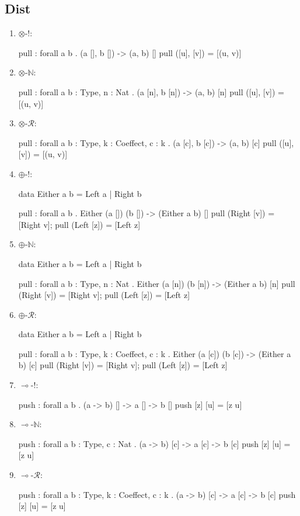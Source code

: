 \subsection{Dist}
\begin{enumerate}
\item $\otimes$-!:
\begin{granule}
pull : forall a b . (a [], b []) -> (a, b) []
pull ([u], [v]) = [(u, v)]
\end{granule}
\item $\otimes$-$\mathbb{N}$:
\begin{granule}
pull : forall {a b : Type, n : Nat} 
     . (a [n], b [n]) 
     -> (a, b) [n]
pull ([u], [v]) = [(u, v)]
\end{granule}
\item $\otimes$-$\mathcal{R}$:
\begin{granule}
pull : forall {a b : Type, k : Coeffect, c : k} 
     . (a [c], b [c]) 
     -> (a, b) [c]
pull ([u], [v]) = [(u, v)]
\end{granule}
\item $\oplus$-!:
\begin{granule}
data Either a b = Left a | Right b

pull : forall a b 
     . Either (a []) (b []) 
     -> (Either a b) []
pull (Right [v]) = [Right v];
pull (Left [z]) = [Left z]
\end{granule}
\item $\oplus$-$\mathbb{N}$:
\begin{granule}
data Either a b = Left a | Right b

pull : forall {a b : Type, n : Nat} 
     . Either (a [n]) (b [n]) 
     -> (Either a b) [n]
pull (Right [v]) = [Right v];
pull (Left [z]) = [Left z]
\end{granule}
\item $\oplus$-$\mathcal{R}$:
\begin{granule}
data Either a b = Left a | Right b

pull : forall {a b : Type, k : Coeffect, c : k} 
     . Either (a [c]) (b [c]) 
     -> (Either a b) [c]
pull (Right [v]) = [Right v];
pull (Left [z]) = [Left z]
\end{granule}
\item $\multimap$-!:
\begin{granule}
push : forall a b  
     . (a -> b) [] 
     -> a [] 
     -> b []
push [z] [u] = [z u]
\end{granule}
\item $\multimap$-$\mathbb{N}$:
\begin{granule}
push : forall {a b : Type, c : Nat}
     . (a -> b) [c] 
     -> a [c] 
     -> b [c]
push [z] [u] = [z u]
\end{granule}
\item $\multimap$-$\mathcal{R}$:
\begin{granule}
push : forall {a b : Type, k : Coeffect, c : k} 
     . (a -> b) [c] 
     -> a [c] 
     -> b [c]
push [z] [u] = [z u]
\end{granule}
\end{enumerate}

